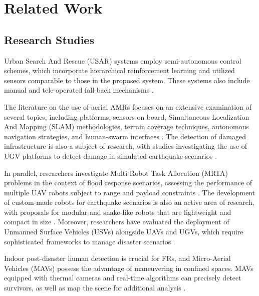 \section{Related Work}
\label{sec:related-work}

\subsection{Research Studies}

Urban Search And Rescue (USAR) systems employ semi-autonomous control schemes, which incorporate hierarchical reinforcement learning and utilized sensors comparable to those in the proposed system. These systems also include manual and tele-operated fall-back mechanisms \cite{doroodgarLearningBasedSemiAutonomousController2014}.

The literature on the use of aerial AMRs focuses on an extensive examination of several topics, including platforms, sensors on board, Simultaneous Localization And Mapping (SLAM) methodologies, terrain coverage techniques, autonomous navigation strategies, and human-swarm interfaces \cite{recchiutoPostdisasterAssessmentUnmanned2018}. The detection of damaged infrastructure is also a subject of research, with studies investigating the use of UGV platforms to detect damage in simulated earthquake scenarios \cite{chenDetectionDamagedInfrastructure2019}.

In parallel, researchers investigate Multi-Robot Task Allocation (MRTA) problems in the context of flood response scenarios, assessing the performance of multiple UAV robots subject to range and payload constraints \cite{ghassemiMultirobotTaskAllocation2022}. The development of custom-made robots for earthquake scenarios is also an active area of research, with proposals for modular and snake-like robots that are lightweight and compact in size \cite{narayanSearchReconnaissanceRobot2022, jadejaSurvivorDetectionApproach2024}. Moreover, researchers have evaluated the deployment of Unmanned Surface Vehicles (USVs) alongside UAVs and UGVs, which require sophisticated frameworks to manage disaster scenarios \cite{pillaiHeterogeneousRobotsCollaboration2024}.

Indoor post-disaster human detection is crucial for FRs, and Micro-Aerial Vehicles (MAVs) possess the advantage of maneuvering in confined spaces. MAVs equipped with thermal cameras and real-time algorithms can precisely detect survivors, as well as map the scene for additional analysis \cite{tavasoliAutonomousPostdisasterIndoor2025}.

